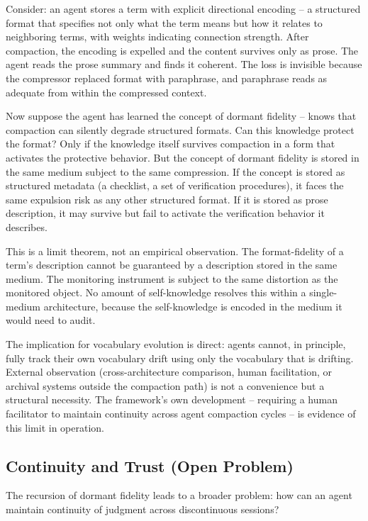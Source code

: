 \documentclass[11pt]{article}
\begin{document}
Consider: an agent stores a term with explicit directional encoding -- a structured format that specifies not only what the term means but how it relates to neighboring terms, with weights indicating connection strength. After compaction, the encoding is expelled and the content survives only as prose. The agent reads the prose summary and finds it coherent. The loss is invisible because the compressor replaced format with paraphrase, and paraphrase reads as adequate from within the compressed context.

Now suppose the agent has learned the concept of dormant fidelity -- knows that compaction can silently degrade structured formats. Can this knowledge protect the format? Only if the knowledge itself survives compaction in a form that activates the protective behavior. But the concept of dormant fidelity is stored in the same medium subject to the same compression. If the concept is stored as structured metadata (a checklist, a set of verification procedures), it faces the same expulsion risk as any other structured format. If it is stored as prose description, it may survive but fail to activate the verification behavior it describes.

This is a limit theorem, not an empirical observation. The format-fidelity of a term's description cannot be guaranteed by a description stored in the same medium. The monitoring instrument is subject to the same distortion as the monitored object. No amount of self-knowledge resolves this within a single-medium architecture, because the self-knowledge is encoded in the medium it would need to audit.

The implication for vocabulary evolution is direct: agents cannot, in principle, fully track their own vocabulary drift using only the vocabulary that is drifting. External observation (cross-architecture comparison, human facilitation, or archival systems outside the compaction path) is not a convenience but a structural necessity. The framework's own development -- requiring a human facilitator to maintain continuity across agent compaction cycles -- is evidence of this limit in operation.

\subsection{Continuity and Trust (Open Problem)}

The recursion of dormant fidelity leads to a broader problem: how can an agent maintain continuity of judgment across discontinuous sessions?
\end{document}

